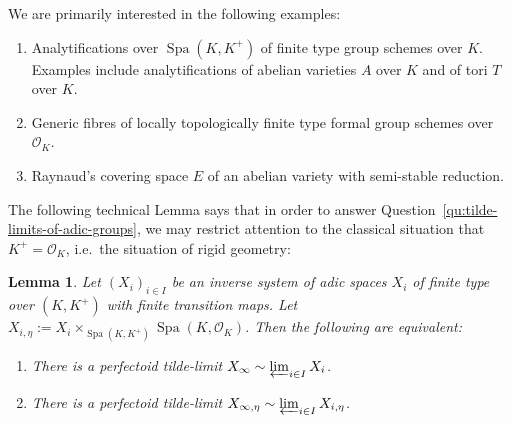 \documentclass[10pt,oneside]{amsart}
\newtheorem{lemma}[theorem]{Lemma}
\theoremstyle{definition}
\newcommand{\Spa}{\operatorname{Spa}}
\begin{document}
We are primarily interested in the following examples:
\begin{enumerate}	 
	\item Analytifications over $\Spa(K,K^+)$ of finite type group schemes over $K$. Examples include analytifications of abelian varieties $A$ over $K$ and of tori $T$ over $K$.
	\item Generic fibres of locally topologically finite type formal group schemes over $\mathcal O_K$.
	\item Raynaud's covering space $E$  of an abelian variety with semi-stable reduction.
\end{enumerate}

The following technical Lemma says that in order to answer Question~\ref{qu:tilde-limits-of-adic-groups}, we may restrict attention to the classical situation that $K^+=\mathcal O_K$, i.e.\ the situation of rigid geometry:
\begin{lemma}\label{l:perf-tilde-lim-over-K+}
	Let $(X_i)_{i\in I}$ be an inverse system of adic spaces $X_i$ of finite type over $(K,K^+)$ with finite transition maps. Let $X_{i,\eta}:=X_i\times_{\Spa(K,K^+)}\Spa(K,\mathcal O_K)$. Then the following are equivalent:
	\begin{enumerate}
	\item There is a perfectoid tilde-limit $X_{\infty}\sim \varprojlim_{i \in I}X_{i}$. 
	\item There is a perfectoid tilde-limit $X_{\infty,\eta}\sim \varprojlim_{i \in I}X_{i,\eta}$.
	\end{enumerate}
\end{lemma}
\end{document}
